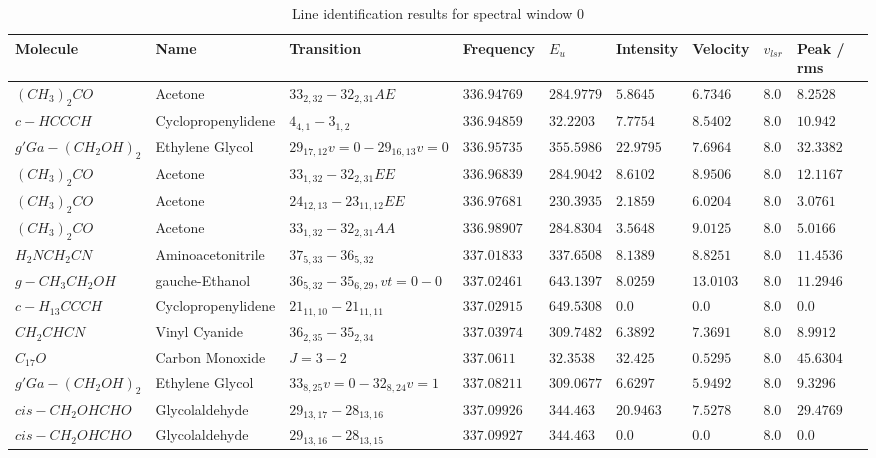 \documentclass{aa}
\begin{document}
\begin{table}
 \label{table:1}  
     \caption{Line identification results for spectral window 0}
 \tiny
    \centering    
    \begin{tabular}{l l l l l l l l l} 
    \hline    
    Molecule & Name &Transition & Frequency & $E_{u}$ & Intensity & Velocity & $v_{lsr}$ & Peak / rms\\ 
    \hline   
$(CH_{3})_{2}CO$ & Acetone & $33_{2,32}-32_{2,31}AE$ & $336.94769$ & $284.9779$ & $5.8645$ & $6.7346$ & $8.0$ & $8.2528$\\
$c-HCCCH$ & Cyclopropenylidene & $4_{4,1}-3_{1,2}$ & $336.94859$ & $32.2203$ & $7.7754$ & $8.5402$ & $8.0$ & $10.942$\\
$g'Ga-(CH_{2}OH)_{2}$ & Ethylene Glycol & $29_{17,12}v=0-29_{16,13}v=0$ & $336.95735$ & $355.5986$ & $22.9795$ & $7.6964$ & $8.0$ & $32.3382$\\
$(CH_{3})_{2}CO$ & Acetone & $33_{1,32}-32_{2,31}EE$ & $336.96839$ & $284.9042$ & $8.6102$ & $8.9506$ & $8.0$ & $12.1167$\\
$(CH_{3})_{2}CO$ & Acetone & $24_{12,13}-23_{11,12}EE$ & $336.97681$ & $230.3935$ & $2.1859$ & $6.0204$ & $8.0$ & $3.0761$\\
$(CH_{3})_{2}CO$ & Acetone & $33_{1,32}-32_{2,31}AA$ & $336.98907$ & $284.8304$ & $3.5648$ & $9.0125$ & $8.0$ & $5.0166$\\
$H_{2}NCH_{2}CN$ & Aminoacetonitrile & $37_{5,33}-36_{5,32}$ & $337.01833$ & $337.6508$ & $8.1389$ & $8.8251$ & $8.0$ & $11.4536$\\
$g-CH_{3}CH_{2}OH$ & gauche-Ethanol & $36_{5,32}-35_{6,29},vt=0-0$ & $337.02461$ & $643.1397$ & $8.0259$ & $13.0103$ & $8.0$ & $11.2946$\\
$c-H_{13}CCCH$ & Cyclopropenylidene & $21_{11,10}-21_{11,11}$ & $337.02915$ & $649.5308$ & $0.0$ & $0.0$ & $8.0$ & $0.0$\\
$CH_{2}CHCN$ & Vinyl Cyanide & $36_{2,35}-35_{2,34}$ & $337.03974$ & $309.7482$ & $6.3892$ & $7.3691$ & $8.0$ & $8.9912$\\
$C_{17}O$ & Carbon Monoxide & $J=3-2$ & $337.0611$ & $32.3538$ & $32.425$ & $0.5295$ & $8.0$ & $45.6304$\\
$g'Ga-(CH_{2}OH)_{2}$ & Ethylene Glycol & $33_{8,25}v=0-32_{8,24}v=1$ & $337.08211$ & $309.0677$ & $6.6297$ & $5.9492$ & $8.0$ & $9.3296$\\
$cis-CH_{2}OHCHO$ & Glycolaldehyde & $29_{13,17}-28_{13,16}$ & $337.09926$ & $344.463$ & $20.9463$ & $7.5278$ & $8.0$ & $29.4769$\\
$cis-CH_{2}OHCHO$ & Glycolaldehyde & $29_{13,16}-28_{13,15}$ & $337.09927$ & $344.463$ & $0.0$ & $0.0$ & $8.0$ & $0.0$\\

\end{tabular}
\end{table}
\end{document}
